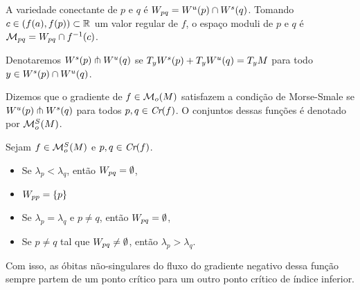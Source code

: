 \documentclass{beamer}
\begin{document}
	\begin{frame}
		
		\begin{definicao}
			A variedade conectante de $p$ e $q$ é $W_{pq} = W^{u}(p)\cap W^{s}(q)$. Tomando $c \in (f(a), f(p)) \subset \mathbb{R}^{}$ um valor regular de $f$, o espaço moduli de $p$ e $q$ é $\mathcal{M}_{pq} = W_{pq}\cap f^{-1}(c)$.
		\end{definicao}
		
		Denotaremos $W^{s}(p)\pitchfork W^{u}(q)$ se $T_{y}W^{s}(p) + T_{y}W^{u}(q) = T_{y}M$ para todo $y \in W^{s}(p)\cap W^{u}(q)$.
		\begin{definicao}
			Dizemos que o gradiente de $f \in \mathcal{M}_{o}(M)$ satisfazem a condição de Morse-Smale se $W^{u}(p)\pitchfork W^{s}(q)$ para todos $p,q \in \textit{Cr}(f)$. O conjuntos dessas funções é denotado por $\mathcal{M}^{S}_{o}(M)$.
		\end{definicao}
		
	\end{frame}
	
	\begin{frame}
		\begin{proposicao}
			Sejam $f \in \mathcal{M}^{S}_{o}(M)$ e $p,q \in \textit{Cr}(f)$.
			\begin{itemize}
				\item Se $\lambda_{p}<\lambda_{q}$, então $W_{pq} = \emptyset$,
				
				\item $W_{pp} = \{p\}$
				
				\item Se $\lambda_{p} = \lambda_{q}$ e $p\neq q$, então $W_{pq} = \emptyset$,
				
				\item Se $p \neq q$ tal que $W_{pq} \neq \emptyset$, então $\lambda_{p}>\lambda_{q}$.
			\end{itemize}
		\end{proposicao}
		
		Com isso, as óbitas não-singulares do fluxo do gradiente negativo dessa função sempre partem de um ponto crítico para um outro ponto crítico de índice inferior.
		
	\end{frame}
	
\end{document}
